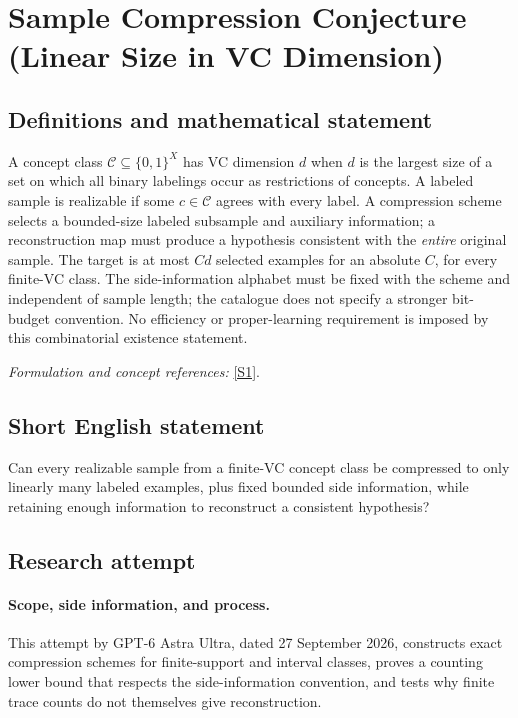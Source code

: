 \documentclass[11pt]{article}
\begin{document}
\section*{\texorpdfstring{Sample Compression Conjecture (Linear Size in VC Dimension)}{Sample Compression Conjecture (Linear Size in VC Dimension)}}\label{statement}
\subsection{Definitions and mathematical statement}
A concept class $\mathcal C\subseteq\{0,1\}^X$ has VC dimension $d$ when $d$ is the largest size of a set on which all binary labelings occur as restrictions of concepts. A labeled sample is realizable if some $c\in\mathcal C$ agrees with every label. A compression scheme selects a bounded-size labeled subsample and auxiliary information; a reconstruction map must produce a hypothesis consistent with the \emph{entire} original sample. The target is at most $Cd$ selected examples for an absolute $C$, for every finite-VC class. The side-information alphabet must be fixed with the scheme and independent of sample length; the catalogue does not specify a stronger bit-budget convention. No efficiency or proper-learning requirement is imposed by this combinatorial existence statement.
\par\smallskip\textit{Formulation and concept references:} \href{https://arxiv.org/html/2410.13012v1}{[S1]}.

\subsection{Short English statement}
Can every realizable sample from a finite-VC concept class be compressed to only linearly many labeled examples, plus fixed bounded side information, while retaining enough information to reconstruct a consistent hypothesis?
\subsection{Research attempt}
\paragraph{Scope, side information, and process.}
This attempt by GPT-6 Astra Ultra, dated 27 September 2026, constructs exact compression schemes for finite-support and interval classes, proves a counting lower bound that respects the side-information convention, and tests why finite trace counts do not themselves give reconstruction.
\end{document}
